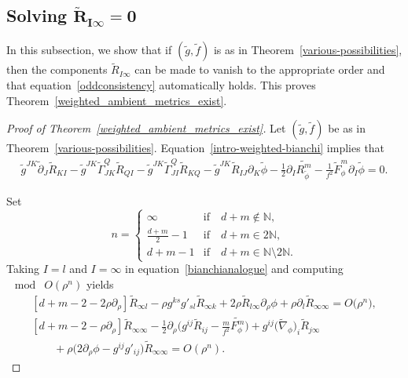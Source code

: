 \documentclass[pdftex]{sigma}
\numberwithin{equation}{section}
\begin{document}
\subsection[Solving widetilde {R}\_\{I infty\}=0]{Solving $\boldsymbol{\widetilde{R}_{I\infty}=0}$}
In this subsection, we show that if $(\widetilde{g},\widetilde{f})$ is as in Theorem~\ref{various-possibilities}, then the components $\widetilde{R}_{I\infty}$ can be made to vanish to the appropriate order and that equation~\eqref{oddconsistency} automatically holds. This proves Theorem~\ref{weighted_ambient_metrics_exist}.

\begin{proof}[Proof of Theorem~\ref{weighted_ambient_metrics_exist}]
Let $(\widetilde{g},\widetilde{f})$ be as in Theorem~\ref{various-possibilities}. Equation~\eqref{intro-weighted-bianchi} implies that
\begin{gather}
\widetilde{g}^{JK}\widetilde{\partial}_J\widetilde{R}_{KI} -\widetilde{g}^{JK}\widetilde{\Gamma}_{JK}^Q\widetilde{R}_{QI} -\widetilde{g}^{JK}\widetilde{\Gamma}_{JI}^Q\widetilde{R}_{KQ} -\widetilde{g}^{JK}\widetilde{R}_{IJ}\partial_K \widetilde{\phi}
\!-\frac{1}{2}\partial_I \widetilde{R_{\widetilde{\phi}}^m}-\frac{1}{f^2}\widetilde{F}_\phi^m \partial_I\widetilde{\phi}=0.\!
\label{bianchianalogue}
\end{gather}

Set
\begin{equation*}
n=\begin{cases}
\infty & \text{if}\quad d+m\notin\mathbb{N},\\
\frac{d+m}{2}-1&\text{if}\quad d+m\in 2\mathbb{N},\\
d+m-1& \text{if}\quad d+m\in \mathbb{N}\setminus 2\mathbb{N}.
\end{cases}
\end{equation*}
Taking $I=l$ and $I=\infty$ in equation~\eqref{bianchianalogue} and computing$\;\bmod \;O(\rho^{n})$ yields
\begin{subequations}
\label{bianchieqns}
\begin{gather}
\label{bianchi2}
[d+m-2-2\rho\partial_{\rho}] \widetilde{R}_{\infty l}-\rho g^{ks}g'_{sl}\widetilde{R}_{\infty k}+2\rho \widetilde{R}_{l\infty}\partial_\rho \phi+\rho \partial_l\widetilde{R}_{\infty\infty}=O\big(\rho^{n}\big),
\\
[d+m-2-\rho\partial_{\rho}] \widetilde{R}_{\infty\infty}
-\frac{1}{2}\partial_{\rho}\bigg(g^{ij}\widetilde{R}_{ij}-\frac{m}{f^2}\widetilde{F_\phi^m}\bigg)
+g^{ij}\big(\widetilde{\nabla}_\phi\big)_i\widetilde{R}_{j\infty}\nonumber
\\ \qquad
+\rho\big(2\partial_\rho\phi-g^{ij}g'_{ij}\big)\widetilde{R}_{\infty\infty}
=O(\rho^{n})\label{bianchi3}.
\end{gather}
\end{subequations}


\end{proof}
\end{document}
